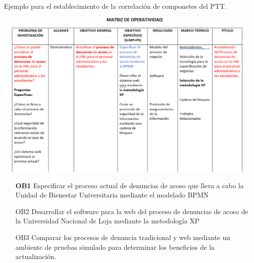 Ejemplo para el establecimiento de la correlación de componetes del PTT.


\includegraphics[scale=0.6]{img/matriz.png}

\begin{enumerate}

    \item[\textbf{OB1}] Especificar el proceso actual de denuncias de acoso que lleva a cabo la Unidad de Bienestar Universitaria mediante el modelado BPMN
   
    
    \item[OB2] Desarrollar el software para la web del proceso de denuncias de acoso de la Universidad Nacional de Loja mediante la metodología XP
    
    
    \item[OB3] Comparar los procesos de denuncia tradicional y web mediante un ambiente de pruebas simulado para determinar los beneficios de la actualización.
\end{enumerate}